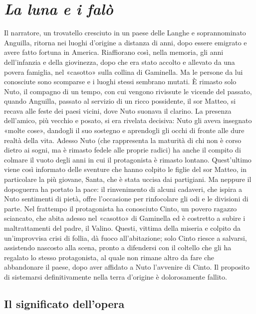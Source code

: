 \documentclass[a4paper, twoside, titlepage]{book}
\newcounter{mar}
\begin{document}
\section{\textit{La luna e i falò}}

Il narratore, un trovatello cresciuto in un paese delle Langhe e soprannominato Anguilla, ritorna nei luoghi d'origine a distanza di anni, dopo essere emigrato e avere fatto fortuna in America. Riaffiorano così, nella memoria, gli anni dell'infanzia e della giovinezza, dopo che era stato accolto e allevato da una povera famiglia, nel «casotto» sulla collina di Gaminella. Ma le persone da lui conosciute sono scomparse e i luoghi stessi sembrano mutati. È rimasto solo Nuto, il compagno di un tempo, con cui vengono rivissute le vicende del passato, quando Anguilla, passato al servizio di un ricco possidente, il sor Matteo, si recava alle feste dei paesi vicini, dove Nuto suonava il clarino. La presenza dell'amico, più vecchio e posato, si era rivelata decisiva: Nuto gli aveva insegnato «molte cose», dandogli il suo sostegno e aprendogli gli occhi di fronte alle dure realtà della vita. Adesso Nuto (che rappresenta la maturità di chi non è corso dietro ai sogni, ma è rimasto fedele alle proprie radici) ha anche il compito di colmare il vuoto degli anni in cui il protagonista è rimasto lontano. Quest'ultimo viene così informato delle sventure che hanno colpito le figlie del sor Matteo, in particolare la più giovane, Santa, che è stata uccisa dai partigiani. Ma neppure il dopoguerra ha portato la pace: il rinvenimento di alcuni cadaveri, che ispira a Nuto sentimenti di pietà, offre l'occasione per rinfocolare gli odi e le divisioni di parte. Nel frattempo il protagonista ha conosciuto Cinto, un povero ragazzo sciancato, che abita adesso nel «casotto» di Gaminella ed è costretto a subire i maltrattamenti del padre, il Valino. Questi, vittima della miseria e colpito da un'improvvisa crisi di follia, dà fuoco all'abitazione; solo Cinto riesce a salvarsi, assistendo nascosto alla scena, pronto a difendersi con il coltello che gli ha regalato lo stesso protagonista, al quale non rimane altro da fare che abbandonare il paese, dopo aver affidato a Nuto l'avvenire di Cinto. Il proposito di sistemarsi definitivamente nella terra d'origine è dolorosamente fallito.

\subsection{Il significato dell'opera}
\end{document}
